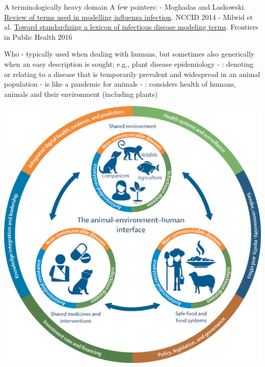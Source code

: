 \documentclass[aspectratio=43]{beamer}
\begin{document}
\begin{frame}{A terminologically heavy domain}
A few pointers:
\vfill
- Moghadas and Laskowski. \href{https://nccid.ca/wp-content/uploads/sites/2/2015/03/ReviewTermsFluWEB.pdf}{Review of terms used in modelling influenza infection}. NCCID 2014
\vfill
- Milwid et al. \href{https://doi.org/10.3389/fpubh.2016.00213}{Toward standardizing a lexicon of infectious disease modeling terms}. Frontiers in Public Health 2016
\end{frame}


\begin{frame}{Who}
-  typically used when dealing with humans, but sometimes also generically when an easy description is sought; e.g., plant disease epidemiology
\vfill
- : denoting or relating to a disease that is temporarily prevalent and widespread in an animal population
\vfill
-  is like a pandemic for animals
\vfill
- : considers health of humans, animals and their environment (including plants)
\end{frame}


\begin{frame}
    \centering
    \includegraphics[height=\textheight]{../FIGS/gr1_lrg.jpg}
\end{frame}
\end{document}
